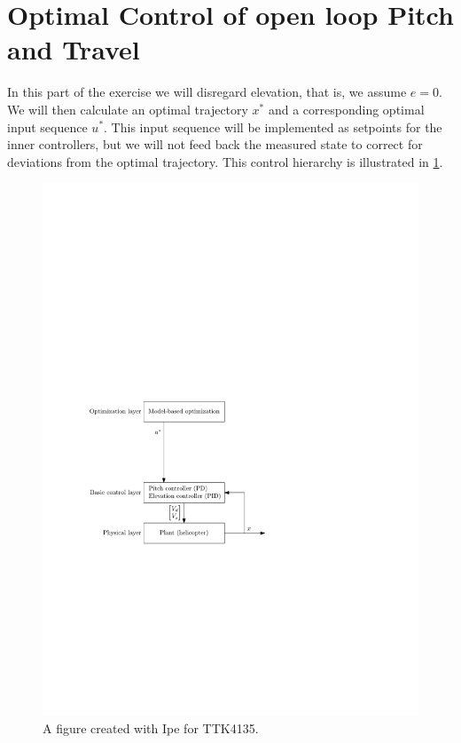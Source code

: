 \documentclass[11pt, a4paper, USenglish]{article} %
\begin{document}
\section{Optimal Control of open loop Pitch and Travel}
In this part of the exercise we will disregard elevation, that is, we assume $e = 0$. We will then calculate an optimal trajectory $x^{*}$ and a corresponding optimal input sequence $u^{*}$. This input sequence will be implemented as setpoints for the inner controllers, but we will not feed back the measured state to correct for deviations from the optimal trajectory. This control hierarchy is illustrated in \cref{fig:layers_openloop}.

\begin{figure}[H]
    \centering
    \includegraphics[width=1.00\textwidth]{figures/layers_openloop.pdf}
    \caption{A figure created with Ipe for TTK4135.}
\label{fig:layers_openloop}
\end{figure}
\end{document}
